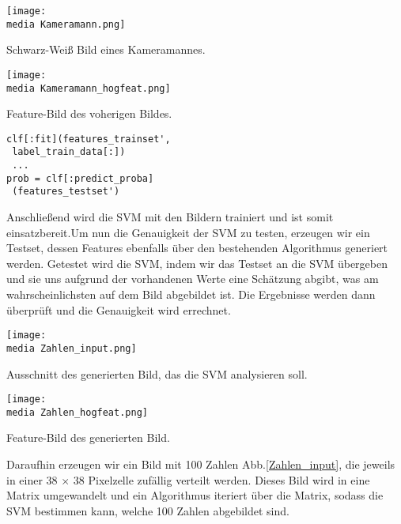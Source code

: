 \begin{dsafigure}
\begin{center}
	\label{Kameramann}
	\texttt{[image: \\media Kameramann.png]}
	\caption{Schwarz-Weiß Bild eines Kameramannes.}
\end{center}
\end{dsafigure}

\begin{dsafigure}
\begin{center}
	\label{Kameramann_hogfeat}
	\texttt{[image: \\media Kameramann\_hogfeat.png]}
	\caption{Feature-Bild des voherigen Bildes.}
\end{center}
\end{dsafigure}

\begin{verbatim}
clf[:fit](features_trainset', 
 label_train_data[:])
 ...
prob = clf[:predict_proba]
 (features_testset')
\end{verbatim}

Anschließend wird die SVM mit den Bildern trainiert und ist somit einsatzbereit.Um nun die Genauigkeit der SVM zu testen, erzeugen wir ein Testset, dessen Features ebenfalls über den bestehenden Algorithmus generiert werden. Getestet wird die SVM, indem wir das Testset an die SVM übergeben und sie uns aufgrund der vorhandenen Werte eine Schätzung abgibt, was am wahrscheinlichsten auf dem Bild abgebildet ist. Die Ergebnisse werden dann überprüft und die Genauigkeit wird errechnet.

\begin{dsafigure}
\begin{center}
	\label{Zahlen_input}
	\texttt{[image: \\media Zahlen\_input.png]}
	\caption{Ausschnitt des generierten Bild, das die SVM analysieren soll.}
\end{center}
\end{dsafigure}

\begin{dsafigure}
\begin{center}
	\label{Zahlen_hogfeat}
	\texttt{[image: \\media Zahlen\_hogfeat.png]}
	\caption{Feature-Bild des generierten Bild.}
\end{center}
\end{dsafigure}

Daraufhin erzeugen wir ein Bild mit 100 Zahlen Abb.\ref{Zahlen_input}, die jeweils in einer 38 $\times$ 38 Pixelzelle zufällig verteilt werden. Dieses Bild wird in eine Matrix umgewandelt und ein Algorithmus iteriert über die Matrix, sodass die SVM bestimmen kann, welche 100 Zahlen abgebildet sind.


